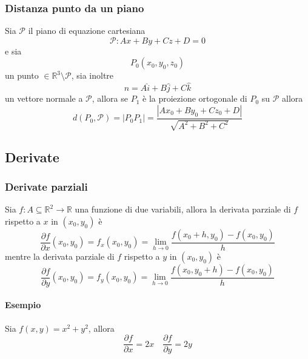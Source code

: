 \documentclass[twoside]{article}
\begin{document}
\subsubsection{Distanza punto da un piano}
Sia \(\mathcal{P}\) il piano di equazione cartesiana
\begin{equation*}
  \mathcal{P} : Ax + By + Cz + D = 0
\end{equation*}
e sia
\begin{equation*}
  P_0(x_0, y_0, z_0)
\end{equation*}
un punto \(\in \mathbb{R}^3 \setminus \mathcal{P}\), sia inoltre
\begin{equation*}
  \hat{n} = A \hat{i} + B \hat{j} + C \hat{k}
\end{equation*}
un vettore normale a \(\mathcal{P}\), allora se \(P_1\) è la proiezione ortogonale di \(P_0\) su \(\mathcal{P}\) allora
\begin{equation}
  \boxed{d(P_0, \mathcal{P}) = |P_0 P_1| = \frac{|Ax_0 + By_0 + Cz_0 + D|}{\sqrt{A^2 + B^2 + C^2}}}
\end{equation}

\newpage
\subsection{Derivate}
\subsubsection{Derivate parziali}
Sia \(f : A \subseteq \mathbb{R}^2 \rightarrow \mathbb{R}\) una funzione di due variabili, allora la derivata parziale di \(f\) rispetto a \(x\) in \((x_0, y_0)\) è
\begin{equation}
  \boxed{
    \frac{\partial f}{\partial x} (x_0, y_0) = f_x(x_0, y_0) = \lim_{h \to 0} \frac{f(x_0 + h, y_0) - f(x_0, y_0)}{h}
  }
\end{equation}
mentre la derivata parziale di \(f\) rispetto a \(y\) in \((x_0, y_0)\) è
\begin{equation}
  \boxed{
    \frac{\partial f}{\partial y} (x_0, y_0) = f_y(x_0, y_0) = \lim_{h \to 0} \frac{f(x_0, y_0 + h) - f(x_0, y_0)}{h}
  }
\end{equation}
\paragraph[short]{Esempio}
Sia \(f(x, y) = x^2 + y^2\), allora
\begin{equation*}
  \frac{\partial f}{\partial x} = 2x \quad \frac{\partial f}{\partial y} = 2y
\end{equation*}
\end{document}
